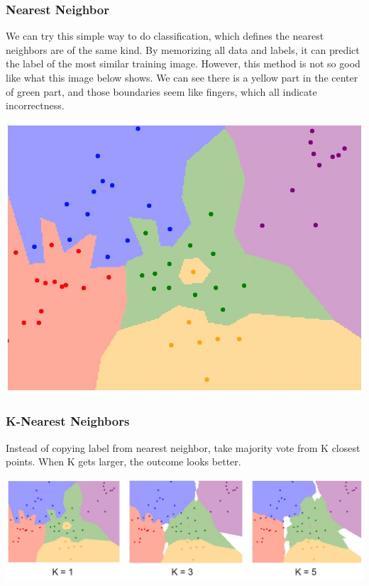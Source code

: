 \documentclass{article}
\begin{document}
\subsubsection{Nearest Neighbor}
We can try this simple way to do classification, which defines the nearest neighbors are of the same kind. By memorizing all data and labels, it can predict the label of the most similar training image. However, this method is not so good like what this image below shows. We can see there is a yellow part in the center of green part, and those boundaries seem like fingers, which all indicate incorrectness.
\begin{center}
\includegraphics[scale=0.3]{neighbor.jpg}
\end{center}

\subsubsection{K-Nearest Neighbors}
Instead of copying label from nearest neighbor, take majority vote from K closest points. When K gets larger, the outcome looks better.
\begin{center}
\includegraphics[scale=0.5]{K.png}
\end{center}
\end{document}
